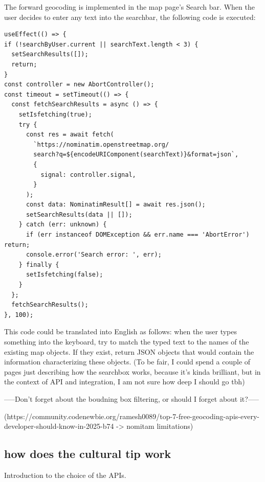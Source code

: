 The forward geocoding is implemented in the map page's Search bar. When the user decides to enter any text into the searchbar, the following code is executed:
\begin{verbatim}
useEffect(() => {
if (!searchByUser.current || searchText.length < 3) {
  setSearchResults([]);
  return;
}
const controller = new AbortController();
const timeout = setTimeout(() => {
  const fetchSearchResults = async () => {
    setIsfetching(true);
    try {
      const res = await fetch(
        `https://nominatim.openstreetmap.org/
        search?q=${encodeURIComponent(searchText)}&format=json`,
        {
          signal: controller.signal,
        }
      );
      const data: NominatimResult[] = await res.json();
      setSearchResults(data || []);
    } catch (err: unknown) {
      if (err instanceof DOMException && err.name === 'AbortError') return;
      console.error('Search error: ', err);
    } finally {
      setIsfetching(false);
    }
  };
  fetchSearchResults();
}, 100);
\end{verbatim}
This code could be translated into English as follows: when the user types something into the keyboard, try to match the typed text to the names of the existing map objects. If they exist, return JSON objects that would contain the information characterizing these objects. (To be fair, I could spend a couple of pages just describing how the searchbox works, because it's kinda brilliant, but in the context of API and integration, I am not sure how deep I should go tbh)


-----Don't forget about the boudning box filtering, or should I forget about it?-----

(https://community.codenewbie.org/ramesh0089/top-7-free-geocoding-apis-every-developer-should-know-in-2025-b74 -> nomitam limitations)

\subsection{how does the cultural tip work}
Introduction to the choice of the APIs.

